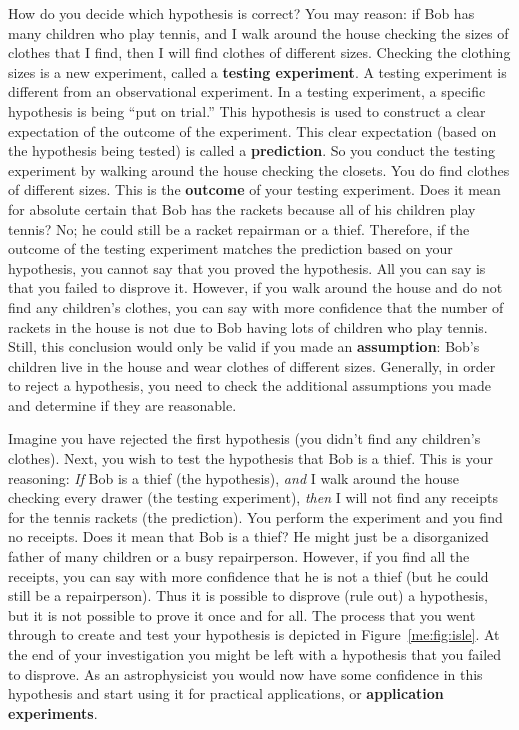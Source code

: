 How do you decide which hypothesis is correct? You may reason: if Bob has many children who play tennis, and I walk around the house checking the sizes of clothes that I find, then I will find clothes of different sizes. Checking the clothing sizes is a new experiment, called a \textbf{testing experiment}. A testing experiment is different from an observational experiment. In a testing experiment, a specific hypothesis is being ``put on trial.'' This hypothesis is used to construct a clear expectation of the outcome of the experiment. This clear expectation (based on the hypothesis being tested) is called a \textbf{prediction}. So you conduct the testing experiment by walking around the house checking the closets. You do find clothes of different sizes. This is the \textbf{outcome} of your testing experiment. Does it mean for absolute certain that Bob has the rackets because all of his children play tennis? No; he could still be a racket repairman or a thief. Therefore, if the outcome of the testing experiment matches the prediction based on your hypothesis, you cannot say that you proved the hypothesis. All you can say is that you failed to disprove it. However, if you walk around the house and do not find any children's clothes, you can say with more confidence that the number of rackets in the house is not due to Bob having lots of children who play tennis. Still, this conclusion would only be valid if you made an \textbf{assumption}: Bob's children live in the house and wear clothes of different sizes. Generally, in order to reject a hypothesis, you need to check the additional assumptions you made and determine if they are reasonable.

Imagine you have rejected the first hypothesis (you didn't find any children's clothes). Next, you wish to test the hypothesis that Bob is a thief. This is your reasoning: \textit{If} Bob is a thief (the hypothesis), \textit{and} I walk around the house checking every drawer (the testing experiment), \textit{then} I will not find any receipts for the tennis rackets (the prediction). You perform the experiment and you find no receipts. Does it mean that Bob is a thief? He might just be a disorganized father of many children or a busy repairperson. However, if you find all the receipts, you can say with more confidence that he is not a thief (but he could still be a repairperson). Thus it is possible to disprove (rule out) a hypothesis, but it is not possible to prove it once and for all. The process that you went through to create and test your hypothesis is depicted in Figure~\ref{me:fig:isle}. At the end of your investigation you might be left with a hypothesis that you failed to disprove. As an astrophysicist you would now have some confidence in this hypothesis and start using it for practical applications, or \textbf{application experiments}.

